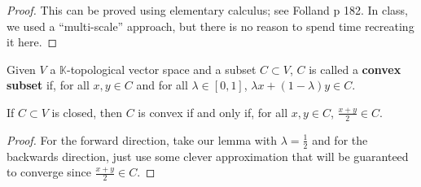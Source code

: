 \documentclass[11pt,leqno,oneside]{amsbook}
\numberwithin{thm}{section}
\newcommand{\K}{\mathbb{K}} %
\renewcommand{\de}{\textbf} %
\begin{document}
\begin{proof}
  This can be proved using elementary calculus; see Folland p 182. In class, we used a
  ``multi-scale'' approach, but there is no reason to spend time
  recreating it here.
\end{proof}
\begin{defn}
  Given \(V\) a \(\K\)-topological vector space and a subset \(C
  \subset V\), \(C\) is called a \de{convex subset} if, for all \(x,y
  \in C\) and for all \(\lambda \in [0,1]\), \(\lambda x +
  (1-\lambda)y \in C\).
\end{defn}
\begin{prop}
  If \(C \subset V\) is closed, then \(C\) is convex if and only if,
  for all \(x,y \in C\), \(\frac{x+y}{2} \in C\).
\end{prop}
\begin{proof}
  For the forward direction, take our lemma with \(\lambda =
  \frac{1}{2}\) and for the backwards direction, just use some clever
  approximation that will be guaranteed to converge since
  \(\frac{x+y}{2} \in C\).
\end{proof}
\end{document}
